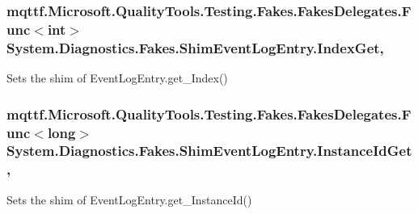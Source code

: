 \hypertarget{class_system_1_1_diagnostics_1_1_fakes_1_1_shim_event_log_entry_a475d4b697761c694f5d7ebf4d10bd30a}{
\subsubsection[{Index\-Get}]{\setlength{\rightskip}{0pt plus 5cm}mqttf.\-Microsoft.\-Quality\-Tools.\-Testing.\-Fakes.\-Fakes\-Delegates.\-Func$<$int$>$ System.\-Diagnostics.\-Fakes.\-Shim\-Event\-Log\-Entry.\-Index\-Get\hspace{0.3cm}{\ttfamily [get]}, {\ttfamily [set]}}}\label{class_system_1_1_diagnostics_1_1_fakes_1_1_shim_event_log_entry_a475d4b697761c694f5d7ebf4d10bd30a}


Sets the shim of Event\-Log\-Entry.\-get\-\_\-\-Index()

\hypertarget{class_system_1_1_diagnostics_1_1_fakes_1_1_shim_event_log_entry_aede3af464acbd4bc9af1b70866e37ce2}{
\subsubsection[{Instance\-Id\-Get}]{\setlength{\rightskip}{0pt plus 5cm}mqttf.\-Microsoft.\-Quality\-Tools.\-Testing.\-Fakes.\-Fakes\-Delegates.\-Func$<$long$>$ System.\-Diagnostics.\-Fakes.\-Shim\-Event\-Log\-Entry.\-Instance\-Id\-Get\hspace{0.3cm}{\ttfamily [get]}, {\ttfamily [set]}}}\label{class_system_1_1_diagnostics_1_1_fakes_1_1_shim_event_log_entry_aede3af464acbd4bc9af1b70866e37ce2}


Sets the shim of Event\-Log\-Entry.\-get\-\_\-\-Instance\-Id()

